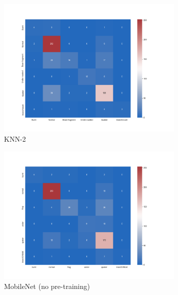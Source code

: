 \begin{figure}[!ht]
    \centering
    \includegraphics[width=0.8\textwidth]{figures/confusionMatrices/KNN-2}
    \caption{KNN-2}
    \label{fig:knn-2}
\end{figure}

\begin{figure}[!ht]
    \centering
    \includegraphics[width=0.8\textwidth]{figures/confusionMatrices/mobileNet-no-pretraining0-5gamma}
    \caption{MobileNet (no pre-training)}
    \label{fig:mobileNetNoPt}
\end{figure}

